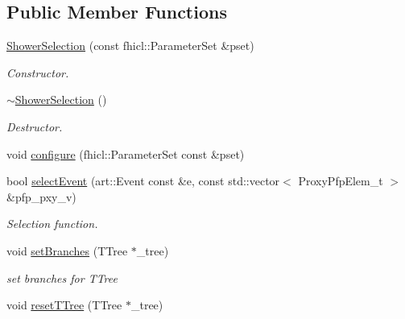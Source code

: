 \subsection*{Public Member Functions}
\begin{DoxyCompactItemize}
\item 
\hyperlink{classselection_1_1ShowerSelection_a07b97cd199fb1eba72923555c4d05ec7}{Shower\-Selection} (const fhicl\-::\-Parameter\-Set \&pset)
\begin{DoxyCompactList}\small\item\em Constructor. \end{DoxyCompactList}\item 
\hypertarget{classselection_1_1ShowerSelection_a59328cc3ca5b6875244f1d2c6a2f3b8e}{\hyperlink{classselection_1_1ShowerSelection_a59328cc3ca5b6875244f1d2c6a2f3b8e}{$\sim$\-Shower\-Selection} ()}\label{classselection_1_1ShowerSelection_a59328cc3ca5b6875244f1d2c6a2f3b8e}

\begin{DoxyCompactList}\small\item\em Destructor. \end{DoxyCompactList}\item 
void \hyperlink{classselection_1_1ShowerSelection_a723729db901f048f4fcb5501895305eb}{configure} (fhicl\-::\-Parameter\-Set const \&pset)
\item 
bool \hyperlink{classselection_1_1ShowerSelection_aa538b905ab6e8a329acf3eaa97cc0af9}{select\-Event} (art\-::\-Event const \&e, const std\-::vector$<$ Proxy\-Pfp\-Elem\-\_\-t $>$ \&pfp\-\_\-pxy\-\_\-v)
\begin{DoxyCompactList}\small\item\em Selection function. \end{DoxyCompactList}\item 
\hypertarget{classselection_1_1ShowerSelection_a1ea09a0f7da6a3e7b9f1eb9728bff1cf}{void \hyperlink{classselection_1_1ShowerSelection_a1ea09a0f7da6a3e7b9f1eb9728bff1cf}{set\-Branches} (T\-Tree $\ast$\-\_\-tree)}\label{classselection_1_1ShowerSelection_a1ea09a0f7da6a3e7b9f1eb9728bff1cf}

\begin{DoxyCompactList}\small\item\em set branches for T\-Tree \end{DoxyCompactList}\item 
\hypertarget{classselection_1_1ShowerSelection_a9d35d47af8468781d97c4e872c96d768}{void \hyperlink{classselection_1_1ShowerSelection_a9d35d47af8468781d97c4e872c96d768}{reset\-T\-Tree} (T\-Tree $\ast$\-\_\-tree)}\label{classselection_1_1ShowerSelection_a9d35d47af8468781d97c4e872c96d768}


\end{DoxyCompactItemize}
